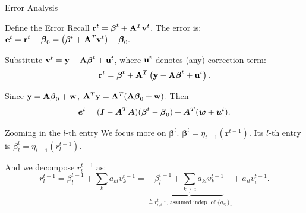 \documentclass[aspectratio=43, 10pt]{beamer}
\begin{document}
\begin{frame}{Error Analysis}
    \vspace{-2mm}
    \begin{block}{Define the Error}
        Recall \(\bold{r}^t = \boldsymbol{\beta}^t + \bold{A}^T \bold{v}^t\). The error is: $\bold{e}^t = \bold{r}^t - \boldsymbol{\beta}_0 = \left( \boldsymbol{\beta}^t + \bold{A}^T \bold{v}^t \right) - \boldsymbol{\beta}_0.$
        
        Substitute \(\bold{v}^t = \bold{y} - \bold{A} \boldsymbol{\beta}^t + \bold{u}^t\), where $\bold{u}^t$ denotes (any) correction term:
        \[
        \bold{r}^t = \boldsymbol{\beta}^t + \bold{A}^T \left( \bold{y} - \bold{A} \boldsymbol{\beta}^t + \bold{u}^t \right).
        \]

        Since \(\bold{y} = \bold{A} \boldsymbol{\beta}_0 + \bold{w}\), $\bold{A}^T \bold{y} = \bold{A}^T (\bold{A} \boldsymbol{\beta}_0 + \bold{w}).$
        Then 
        \begin{equation}
            \boldsymbol{e}^t = (\boldsymbol{I}-\boldsymbol{A}^T \boldsymbol{A})(\boldsymbol{\beta}^t - \boldsymbol{\beta}_0) + \boldsymbol{A}^T (\boldsymbol{w}+ \boldsymbol{u}^t) \notag. 
        \end{equation}
    \end{block}

    \pause 
    
    \vspace{-2mm}
    \begin{block}{Zooming in the $l$-th entry}
        We focus more on $\boldsymbol{\beta}^t$. $\boldsymbol{\beta}^t=\eta_{t-1}(\boldsymbol{r}^{t-1})$. Its $l$-th entry is $\beta^t_l = \eta_{t-1}(r^{t-1}_l)$. 

        And we decompose $r_l^{t-1}$ as: 
        \begin{equation}
            r_l^{t-1} = \beta_l^{t-1} + \sum_{k}a_{kl}v_k^{t-1} = 
            \underbrace{\beta_l^{t-1} + \sum_{k\neq i}a_{kl}v_k^{t-1}}_{\triangleq r_{l \setminus i }^{t-1}, ~\text{assumed indep. of $\{a_{ij}\}_j$}} + a_{il}v_i^{t-1}. 
        \end{equation}
    \end{block}
\end{frame}

\end{document}
